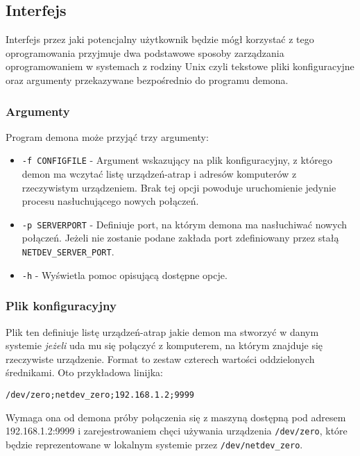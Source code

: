 \documentclass[10pt]{scrartcl}
\begin{document}
\subsection{Interfejs}

Interfejs przez jaki potencjalny użytkownik będzie mógł korzystać z tego oprogramowania przyjmuje dwa podstawowe sposoby zarządzania oprogramowaniem w systemach z rodziny Unix czyli tekstowe pliki konfiguracyjne oraz argumenty przekazywane bezpośrednio do programu
demona.

\subsubsection{Argumenty}

Program demona może przyjąć trzy argumenty:

\begin{itemize}
\itemsep1pt\parskip0pt
    \item \texttt{-f CONFIGFILE} - Argument wskazujący na plik konfiguracyjny, z którego demon ma wczytać listę urządzeń-atrap i adresów komputerów z rzeczywistym urządzeniem. Brak tej opcji powoduje uruchomienie jedynie procesu nasłuchującego nowych połączeń.
    \item \texttt{-p SERVERPORT} - Definiuje port, na którym demona ma nasłuchiwać nowych połączeń. Jeżeli nie zostanie podane zakłada port zdefiniowany przez stałą \texttt{NETDEV\_SERVER\_PORT}.
    \item \texttt{-h} - Wyświetla pomoc opisującą dostępne opcje.
\end{itemize}

\subsubsection{Plik konfiguracyjny}

Plik ten definiuje listę urządzeń-atrap jakie demon ma stworzyć w danym systemie \textit{jeżeli} uda mu się połączyć z komputerem, na którym znajduje się rzeczywiste urządzenie. Format to zestaw czterech wartości oddzielonych średnikami. Oto przykładowa linijka:

\begin{verbatim}
/dev/zero;netdev_zero;192.168.1.2;9999
\end{verbatim}

Wymaga ona od demona próby połączenia się z maszyną dostępną pod adresem 192.168.1.2:9999 i zarejestrowaniem chęci używania urządzenia \texttt{/dev/zero}, które będzie reprezentowane w lokalnym systemie przez \texttt{/dev/netdev\_zero}.
\end{document}
